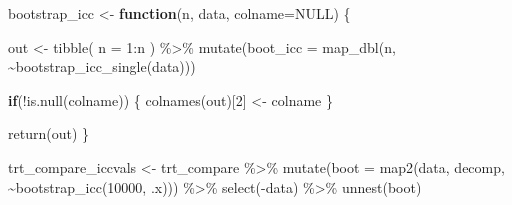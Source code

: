 \documentclass[
]{article}
\newenvironment{Shaded}{\begin{snugshade}}{\end{snugshade}}
\newcommand{\AttributeTok}[1]{\textcolor[rgb]{0.77,0.63,0.00}{#1}}
\newcommand{\CommentTok}[1]{\textcolor[rgb]{0.56,0.35,0.01}{\textit{#1}}}
\newcommand{\ConstantTok}[1]{\textcolor[rgb]{0.00,0.00,0.00}{#1}}
\newcommand{\ControlFlowTok}[1]{\textcolor[rgb]{0.13,0.29,0.53}{\textbf{#1}}}
\newcommand{\DecValTok}[1]{\textcolor[rgb]{0.00,0.00,0.81}{#1}}
\newcommand{\FloatTok}[1]{\textcolor[rgb]{0.00,0.00,0.81}{#1}}
\newcommand{\FunctionTok}[1]{\textcolor[rgb]{0.00,0.00,0.00}{#1}}
\newcommand{\NormalTok}[1]{#1}
\newcommand{\OtherTok}[1]{\textcolor[rgb]{0.56,0.35,0.01}{#1}}
\newcommand{\SpecialCharTok}[1]{\textcolor[rgb]{0.00,0.00,0.00}{#1}}
\newcommand{\StringTok}[1]{\textcolor[rgb]{0.31,0.60,0.02}{#1}}
\begin{document}
\begin{Shaded}
\begin{Highlighting}[]
\NormalTok{bootstrap\_icc }\OtherTok{\textless{}{-}} \ControlFlowTok{function}\NormalTok{(n, data, }\AttributeTok{colname=}\ConstantTok{NULL}\NormalTok{) \{}
  
\NormalTok{  out }\OtherTok{\textless{}{-}} \FunctionTok{tibble}\NormalTok{(}
    \AttributeTok{n =} \DecValTok{1}\SpecialCharTok{:}\NormalTok{n}
\NormalTok{  ) }\SpecialCharTok{\%\textgreater{}\%} 
    \FunctionTok{mutate}\NormalTok{(}\AttributeTok{boot\_icc =} \FunctionTok{map\_dbl}\NormalTok{(n, }\SpecialCharTok{\textasciitilde{}}\FunctionTok{bootstrap\_icc\_single}\NormalTok{(data)))}
  
  \ControlFlowTok{if}\NormalTok{(}\SpecialCharTok{!}\FunctionTok{is.null}\NormalTok{(colname)) \{}
    \FunctionTok{colnames}\NormalTok{(out)[}\DecValTok{2}\NormalTok{] }\OtherTok{\textless{}{-}}\NormalTok{ colname}
\NormalTok{  \}}
  
  \FunctionTok{return}\NormalTok{(out)}
\NormalTok{\}}
\end{Highlighting}
\end{Shaded}

\begin{Shaded}
\begin{Highlighting}[]
\NormalTok{trt\_compare\_iccvals }\OtherTok{\textless{}{-}}\NormalTok{ trt\_compare }\SpecialCharTok{\%\textgreater{}\%} 
  \FunctionTok{mutate}\NormalTok{(}\AttributeTok{boot =} \FunctionTok{map2}\NormalTok{(data, decomp, }\SpecialCharTok{\textasciitilde{}}\FunctionTok{bootstrap\_icc}\NormalTok{(}\DecValTok{10000}\NormalTok{, .x))) }\SpecialCharTok{\%\textgreater{}\%} 
  \FunctionTok{select}\NormalTok{(}\SpecialCharTok{{-}}\NormalTok{data) }\SpecialCharTok{\%\textgreater{}\%} 
  \FunctionTok{unnest}\NormalTok{(boot)}
\end{Highlighting}
\end{Shaded}

\begin{Shaded}
\end{Shaded}
\end{document}
